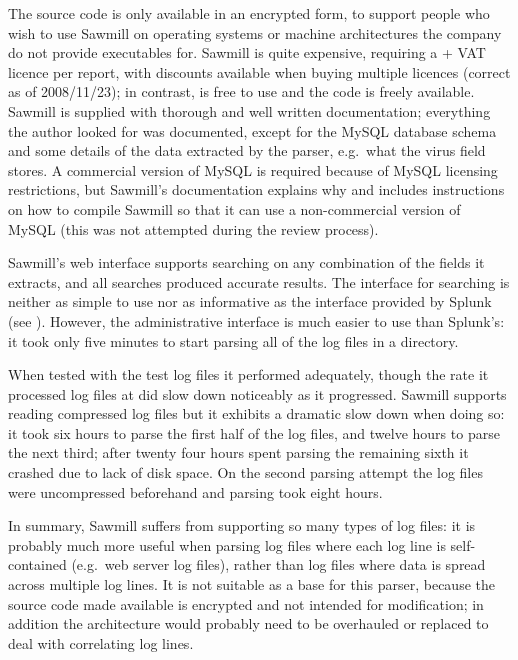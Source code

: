 The source code is only available in an encrypted form, to support people
who wish to use Sawmill on operating systems or machine architectures the
company do not provide executables for.  Sawmill is quite expensive,
requiring a  + VAT licence per report, with discounts available
when buying multiple licences (correct as of 2008/11/23); in contrast,
\parsername{} is free to use and the code is freely available.  Sawmill is
supplied with thorough and well written documentation; everything the
author looked for was documented, except for the MySQL database schema and
some details of the data extracted by the parser, e.g.\ what the virus
field stores.  A commercial version of MySQL is required because of MySQL
licensing restrictions, but Sawmill's documentation explains why and
includes instructions on how to compile Sawmill so that it can use a
non-commercial version of MySQL (this was not attempted during the review
process).

Sawmill's web interface supports searching on any combination of the fields
it extracts, and all searches produced accurate results.  The interface for
searching is neither as simple to use nor as informative as the interface
provided by Splunk (see ).  However, the
administrative interface is much easier to use than Splunk's: it took only
five minutes to start parsing all of the log files in a directory.

When tested with the \numberOFlogFILES{} test log files it performed
adequately, though the rate it processed log files at did slow down
noticeably as it progressed.  Sawmill supports reading compressed log files
but it exhibits a dramatic slow down when doing so: it took six hours to
parse the first half of the log files, and twelve hours to parse the next
third; after twenty four hours spent parsing the remaining sixth it crashed
due to lack of disk space.  On the second parsing attempt the log files
were uncompressed beforehand and parsing took eight hours.

In summary, Sawmill suffers from supporting so many types of log files: it
is probably much more useful when parsing log files where each log line is
self-contained (e.g.\ web server log files), rather than log files where
data is spread across multiple log lines.  It is not suitable as a base for
this parser, because the source code made available is encrypted and not
intended for modification; in addition the architecture would probably need
to be overhauled or replaced to deal with correlating log lines.

